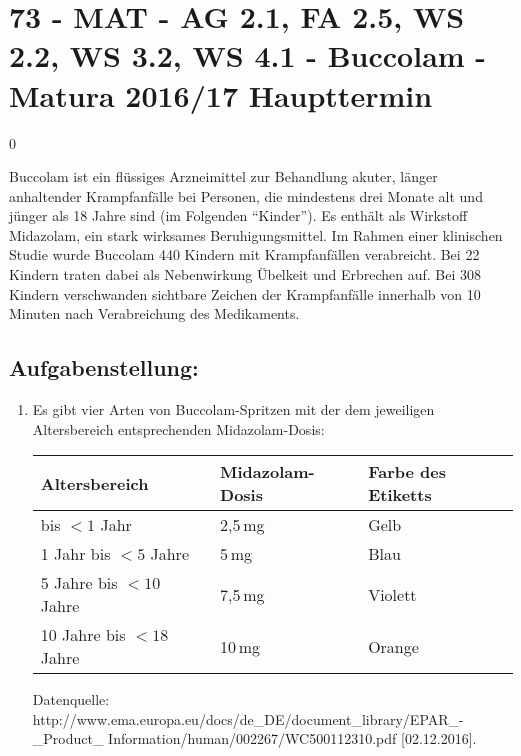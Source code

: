 \section{73 - MAT - AG 2.1, FA 2.5, WS 2.2, WS 3.2, WS 4.1 - Buccolam - Matura 2016/17 Haupttermin}

\begin{langesbeispiel} \item[0] %
	
Buccolam ist ein flüssiges Arzneimittel zur Behandlung akuter, länger anhaltender Krampfanfälle bei Personen, die mindestens drei Monate alt und jünger als 18 Jahre sind (im Folgenden "`Kinder"'). Es enthält als Wirkstoff Midazolam, ein stark wirksames Beruhigungsmittel. Im Rahmen einer klinischen Studie wurde Buccolam 440 Kindern mit Krampfanfällen verabreicht. Bei 22 Kindern traten dabei als Nebenwirkung Übelkeit und Erbrechen auf. Bei 308 Kindern verschwanden sichtbare Zeichen der Krampfanfälle innerhalb von 10 Minuten nach Verabreichung des Medikaments.

\subsection{Aufgabenstellung:}
\begin{enumerate}
	\item Es gibt vier Arten von Buccolam-Spritzen mit der dem jeweiligen Altersbereich entsprechenden Midazolam-Dosis:
	
	\begin{center}
		\begin{tabular}{|l|l|l|}\hline
		\cellcolor[gray]{0.9}Altersbereich&\cellcolor[gray]{0.9}Midazolam-Dosis&\cellcolor[gray]{0.9}Farbe des Etiketts\\ \hline
		bis $<1$ Jahr&2,5\,mg&Gelb\\ \hline
		1 Jahr bis $<5$ Jahre&5\,mg&Blau\\ \hline
		5 Jahre bis $<10$ Jahre&7,5\,mg&Violett\\ \hline
		10 Jahre bis $<18$ Jahre&10\,mg&Orange\\ \hline		
		\end{tabular}
	\end{center}
	
	\begin{scriptsize}\begin{singlespace}Datenquelle: http://www.ema.europa.eu/docs/de\_DE/document\_library/EPAR\_-\_Product\_ Information/human/002267/WC500112310.pdf [02.12.2016].
 \end{singlespace}\end{scriptsize}
	

\end{enumerate}
\end{langesbeispiel}
